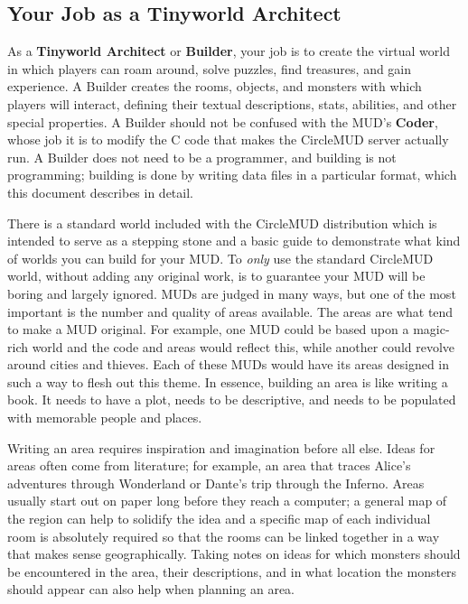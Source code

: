\documentclass[11pt]{article}
\begin{document}
\subsection{Your Job as a Tinyworld Architect}
As a {\bf Tinyworld Architect} or {\bf Builder}, your job is to create the virtual world in which players can roam around, solve puzzles, find treasures, and gain experience.  A Builder creates the rooms, objects, and monsters with which players will interact, defining their textual descriptions, stats, abilities, and other special properties. A Builder should not be confused with the MUD's {\bf Coder}, whose job it is to modify the C code that makes the CircleMUD server actually run.  A Builder does not need to be a programmer, and building is not programming; building is done by writing data files in a particular format, which this document describes in detail. 
\par
There is a standard world included with the CircleMUD distribution which is intended to serve as a stepping stone and a basic guide to demonstrate what kind of worlds you can build for your MUD.  To {\em only} use the standard CircleMUD world, without adding any original work, is to guarantee your MUD will be boring and largely ignored.  MUDs are judged in many ways, but one of the most important is the number and quality of areas available. The areas are what tend to make a MUD original.  For example, one MUD could be based upon a magic-rich world and the code and areas would reflect this, while another could revolve around cities and thieves.  Each of these MUDs would have its areas designed in such a way to flesh out this theme.  In essence, building an area is like writing a book.  It needs to have a plot, needs to be descriptive, and needs to be populated with memorable people and places. 
\par
Writing an area requires inspiration and imagination before all else. Ideas for areas often come from literature; for example, an area that traces Alice's adventures through Wonderland or Dante's trip through the Inferno.  Areas usually start out on paper long before they reach a computer; a general map of the region can help to solidify the idea and a specific map of each individual room is absolutely required so that the rooms can be linked together in a way that makes sense geographically. Taking notes on ideas for which monsters should be encountered in the area, their descriptions, and in what location the monsters should appear can also help when planning an area.
\end{document}
